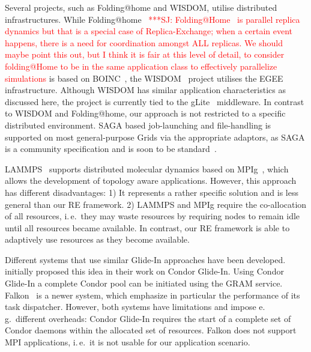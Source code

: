 \documentclass{rspublic}
\newcommand{\jhanote}[1]{ {\textcolor{red} { ***SJ: #1 }}}
\newcommand{\jhanote}[1]{}
\newcommand{\glidein}[1]{Glide-In }
\begin{document}
Several projects, such as Folding@home and WISDOM, utilise distributed
infrastructures. While
Folding@home~\citep{PhysRevLett.86.4983}\jhanote{Folding@Home~\citep{PhysRevLett.86.4983}
is parallel replica dynamics but that is a special case of
Replica-Exchange; when a certain event happens, there is a need for
coordination amongst ALL replicas. We should maybe point this out,
but I think it is fair at this level of detail, to consider
folding@Home to be in the same application class to effectively
parallelize simulations} is based on BOINC~\citep{1033223}, the
WISDOM~\citep{wisdom} project utilises the EGEE infrastructure. 
Although WISDOM has similar application characteristics as discussed
here, the project is currently tied to the gLite~\citep{glite}
middleware.  In contrast to WISDOM and Folding@home, our approach is
not restricted to a specific distributed environment. SAGA based
job-launching and file-handling is supported on most general-purpose
Grids via the appropriate adaptors, as SAGA is a community
specification and is soon to be standard~\citep{saga_url}.       

LAMMPS~\citep{Plimpton:1995nx,1383459} supports distributed molecular
dynamics based on MPIg~\citep{Toonen:2008ao}, which allows the
development of topology aware applications. However, this approach has
different disadvantages: 1) It represents a rather specific solution
and is less general than our RE framework. 2) LAMMPS and MPIg require
the co-allocation of all resources, i.\,e.\ they may waste resources
by requiring nodes to remain idle until all resources became
available.  In contrast, our RE framework is able to adaptively use
resources as they become available.

Different systems that use similar Glide-In approaches have been
developed. \citet{citeulike:291860} initially proposed this idea in
their work on Condor Glide-In. Using Condor Glide-In a complete Condor
pool can be initiated using the GRAM service. Falkon~\citep{1362680}
is a newer system, which emphasize in particular the performance of
its task dispatcher.  However, both systems have limitations and
impose e.\,g.\ different overheads: Condor \glidein\ requires the
start of a complete set of Condor daemons within the allocated set of
resources. 
Falkon  does not support MPI applications, i.\,e.\ it is not usable for our
application scenario.  
                             
\end{document}

